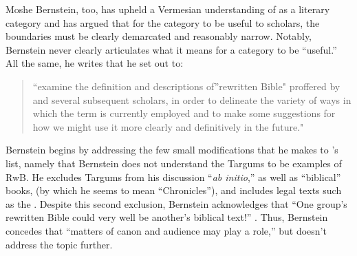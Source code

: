 Moshe Bernstein, too, has upheld a Vermesian understanding of
\rwb as a literary category and has argued that for the
category to be useful to scholars, the boundaries must be clearly
demarcated and reasonably narrow.\autocite{bernstein_textus2005}
Notably, Bernstein never clearly articulates what it means for a
category to be ``useful.'' All the same, he writes that he set out to:

\begin{quote}
``examine the definition and descriptions of''rewritten Bible" proffered
by \vermes and several subsequent scholars, in order to
delineate the variety of ways in which the term is currently employed
and to make some suggestions for how we might use it more clearly and
definitively in the future." \autocite[171--172]{bernstein_textus2005}
\end{quote}

Bernstein begins by addressing the few small modifications that he makes
to \vermes's list, namely that Bernstein does not
understand the Targums to be examples of RwB. He excludes Targums from
his discussion ``\emph{ab initio},'' as well as ``biblical'' books, (by
which he seems to mean ``Chronicles''), and includes legal texts such as
the \templescroll. Despite this second exclusion,
Bernstein acknowledges that ``One group's rewritten Bible could very
well be another's biblical text!'' \autocite[175. This seems
particularly odd, since, and Ethiopian Christian may protest that
\jub should be excluded as well.]{bernstein_textus2005}.
Thus, Bernstein concedes that ``matters of canon and audience may play a
role,'' but doesn't address the topic further.

